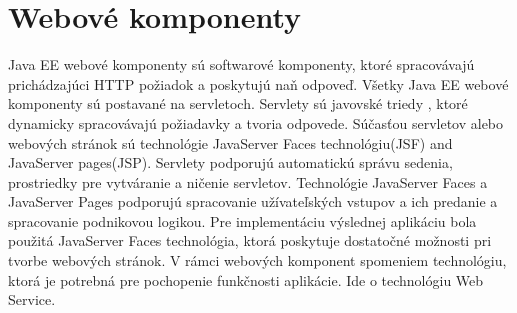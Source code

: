 \section{Webové komponenty}
Java EE webové komponenty sú softwarové komponenty, ktoré spracovávajú prichádzajúci HTTP požiadok a poskytujú naň odpoveď. Všetky Java EE webové komponenty sú postavané na servletoch. Servlety sú javovské triedy , ktoré dynamicky spracovávajú požiadavky a tvoria odpovede. Súčasťou servletov alebo webových stránok  sú technológie JavaServer Faces technológiu(JSF) and JavaServer pages(JSP). Servlety podporujú automatickú správu sedenia, prostriedky pre vytváranie a ničenie servletov. Technológie JavaServer Faces a JavaServer Pages podporujú spracovanie užívateľských vstupov a ich predanie a spracovanie podnikovou logikou. Pre implementáciu výslednej aplikáciu bola použitá JavaServer Faces technológia, ktorá poskytuje dostatočné možnosti pri tvorbe webových stránok. V rámci webových komponent spomeniem technológiu, ktorá je potrebná pre pochopenie funkčnosti aplikácie. Ide o technológiu Web Service.



